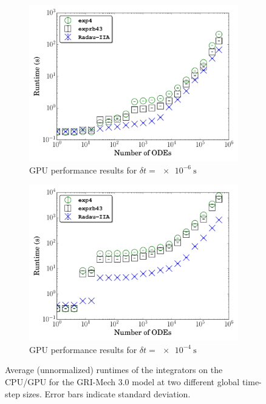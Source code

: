 \documentclass[preprint,review,11pt]{elsarticle}
\begin{document}
\begin{figure}[htb]
\begin{subfigure}{0.49\textwidth}
      \includegraphics[width=\linewidth]{CH4_1e-06_gpu_nonorm.pdf}
      \caption{GPU performance results for $\delta t = \SI{e-6}{\second}$}
  \end{subfigure}
  \begin{subfigure}{0.49\textwidth}
      \includegraphics[width=\linewidth]{CH4_1e-04_gpu_nonorm.pdf}
      \caption{GPU performance results for $\delta t = \SI{e-4}{\second}$}
  \end{subfigure}
  \caption{Average (unnormalized) runtimes of the integrators on the CPU\slash GPU for the GRI-Mech 3.0 model at two different global time-step sizes.
  Error bars indicate standard deviation.}
  \label{F:raw_perf_CH4}
\end{figure}

\clearpage



\end{document}
